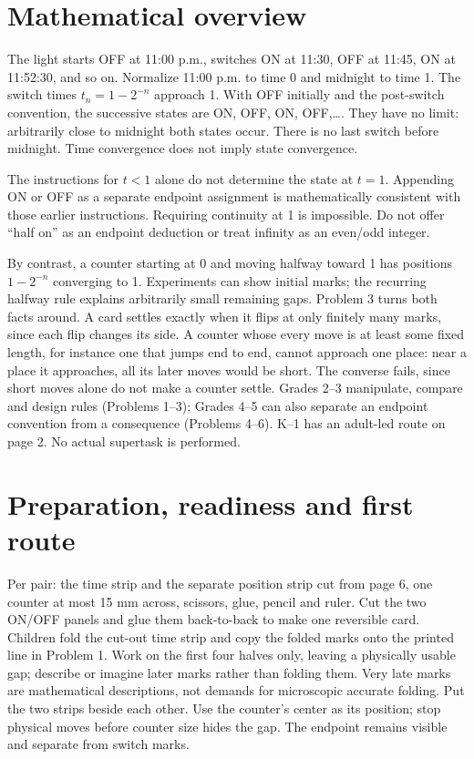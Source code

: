 \documentclass[11pt,letterpaper]{article}
\begin{document}
\section*{Mathematical overview}
The light starts OFF at 11:00 p.m., switches ON at 11:30, OFF at 11:45, ON at 11:52:30, and so on. Normalize 11:00 p.m. to time 0 and midnight to time 1. The switch times $t_n=1-2^{-n}$ approach 1. With OFF initially and the post-switch convention, the successive states are ON, OFF, ON, OFF,\ldots. They have no limit: arbitrarily close to midnight both states occur. There is no last switch before midnight. Time convergence does not imply state convergence.

The instructions for $t<1$ alone do not determine the state at $t=1$. Appending ON or OFF as a separate endpoint assignment is mathematically consistent with those earlier instructions. Requiring continuity at 1 is impossible. Do not offer ``half on'' as an endpoint deduction or treat infinity as an even/odd integer.

By contrast, a counter starting at 0 and moving halfway toward 1 has positions $1-2^{-n}$ converging to 1. Experiments can show initial marks; the recurring halfway rule explains arbitrarily small remaining gaps. Problem 3 turns both facts around. A card settles exactly when it flips at only finitely many marks, since each flip changes its side. A counter whose every move is at least some fixed length, for instance one that jumps end to end, cannot approach one place: near a place it approaches, all its later moves would be short. The converse fails, since short moves alone do not make a counter settle. Grades 2--3 manipulate, compare and design rules (Problems 1--3); Grades 4--5 can also separate an endpoint convention from a consequence (Problems 4--6). K--1 has an adult-led route on page 2. No actual supertask is performed.
\newpage
\section*{Preparation, readiness and first route}
Per pair: the time strip and the separate position strip cut from page 6, one counter at most 15 mm across, scissors, glue, pencil and ruler. Cut the two ON/OFF panels and glue them back-to-back to make one reversible card. Children fold the cut-out time strip and copy the folded marks onto the printed line in Problem 1. Work on the first four halves only, leaving a physically usable gap; describe or imagine later marks rather than folding them. Very late marks are mathematical descriptions, not demands for microscopic accurate folding. Put the two strips beside each other. Use the counter's center as its position; stop physical moves before counter size hides the gap. The endpoint remains visible and separate from switch marks.
\end{document}
